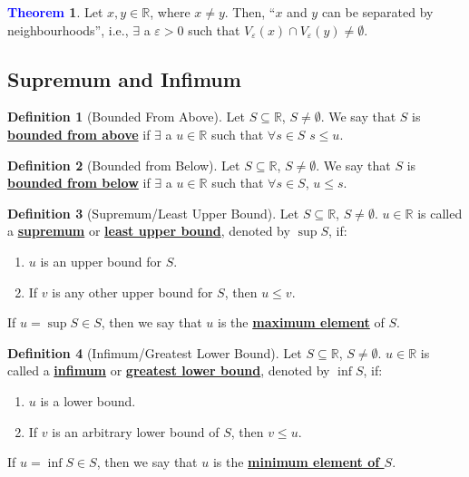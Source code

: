 \documentclass[11pt]{article}
\theoremstyle{definition}
\newcommand{\R}[0]{\mathbb{R}}
\newcommand{\dfn}[1]{\textbf{{\underline{#1}}}}
\newtheorem{theorem}{\textcolor{blue}{Theorem}}
\theoremstyle{definition}
\newtheorem{definition}{\textcolor{OliveGreen}{Definition}}
\theoremstyle{remark}
\begin{document}
\begin{theorem}
	Let $x, y \in \R$, where $x \neq y$. Then, ``$x$ and $y$ can be separated by neighbourhoods'', i.e., $\exists$ a $\varepsilon > 0$ such that $V_\varepsilon(x) \cap V_\varepsilon(y) \neq \emptyset$.
\end{theorem}

\subsection{Supremum and Infimum}
\begin{definition}[Bounded From Above]
	Let $S \subseteq \R$, $S \neq \emptyset$. We say that $S$ is \dfn{bounded from above} if $\exists$ a $u \in \R$ such that $\forall s \in S$ $s \leq u$.
\end{definition}


\begin{definition}[Bounded from Below]
	Let $S \subseteq \R$, $S \neq \emptyset$. We say that $S$ is \dfn{bounded from below} if $\exists$ a $u \in \R$ such that $\forall s \in S$, $u \leq s$.
\end{definition}


\begin{definition}[Supremum/Least Upper Bound]
	Let $S \subseteq \R$, $S \neq \emptyset$. $u \in \R$ is called a \dfn{supremum} or \dfn{least upper bound}, denoted by $\sup{S}$, if: 
	\begin{enumerate}[noitemsep]
		\item $u$ is an upper bound for $S$. 
		\item If $v$ is any other upper bound for $S$, then $u \leq v$.
	\end{enumerate}
	If $u = \sup{S} \in S$, then we say that $u$ is the \dfn{maximum element} of $S$.
\end{definition}

\begin{definition}[Infimum/Greatest Lower Bound]
	Let $S \subseteq \R$, $S \neq \emptyset$. $u \in \R$ is called a \dfn{infimum} or \dfn{greatest lower bound}, denoted by $\inf{S}$, if: 	
	\begin{enumerate}[noitemsep]
		\item $u$ is a lower bound.
		\item If $v$ is an arbitrary lower bound of $S$, then $v \leq u$.
	\end{enumerate}
	If $u = \inf{S} \in S$, then we say that $u$ is the \dfn{minimum element of $S$}.
\end{definition}
\end{document}
